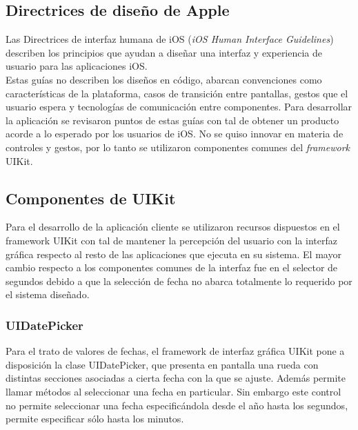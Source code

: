   \subsection{Directrices de diseño de Apple}

Las Directrices de interfaz humana de iOS (\textit{iOS Human Interface Guidelines}) describen los principios que ayudan a diseñar una interfaz y experiencia de usuario para las aplicaciones iOS.\\

Estas guías no describen los diseños en código, abarcan convenciones como características de la plataforma, casos de transición entre pantallas, gestos que el usuario espera y tecnologías de comunicación entre componentes.
Para desarrollar la aplicación se revisaron puntos de estas guías con tal de obtener un producto acorde a lo esperado por los usuarios de iOS. No se quiso innovar en materia de controles y gestos, por lo tanto se utilizaron componentes comunes del \textit{framework} UIKit.
	
	\subsection{Componentes de UIKit}
	Para el desarrollo de la aplicación cliente se utilizaron recursos dispuestos en el framework UIKit con tal de mantener la percepción del usuario con la interfaz gráfica respecto al resto de las aplicaciones que ejecuta en su sistema. El mayor cambio respecto a los componentes comunes de la interfaz fue en el selector de segundos debido a que la selección de fecha no abarca totalmente lo requerido por el sistema diseñado.
	
		\subsubsection{UIDatePicker}
		\label{subsec:datepicker}
Para el trato de valores de fechas, el framework de interfaz gráfica UIKit pone a disposición la clase UIDatePicker, que presenta en pantalla una rueda con distintas secciones asociadas a cierta fecha con la que se ajuste. Además permite llamar métodos al seleccionar una fecha en particular. Sin embargo este control no permite seleccionar una fecha especificándola desde el año hasta los segundos, permite especificar sólo hasta los minutos. \\


